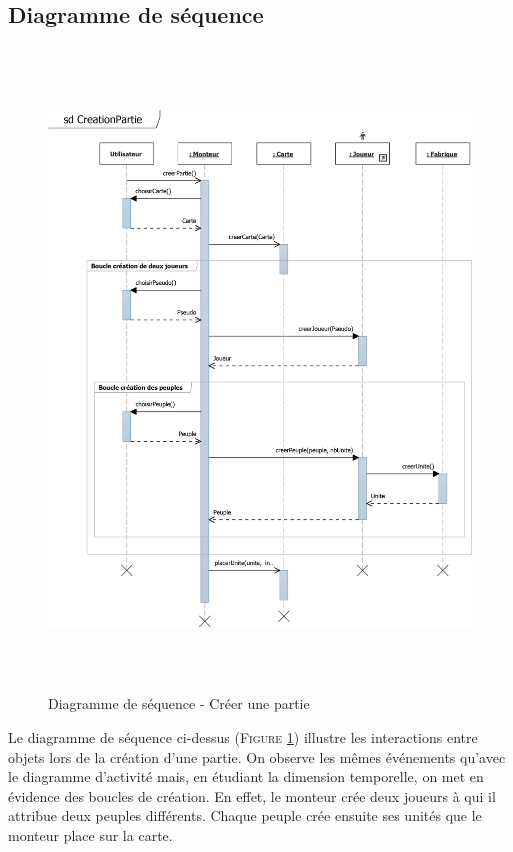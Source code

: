 \documentclass[a4paper,11pt]{article}
\begin{document}
	\subsection{Diagramme de séquence}
		\begin{figure}[ht!]
			\includegraphics[height=17cm]{Diagrammes/Creation/sqCreerPartie.png}
			\caption{Diagramme de séquence - Créer une partie}
			\label{fig:seqcreer}
			\end{figure}
		\vspace*{1cm}
		Le diagramme de séquence ci-dessus (\textsc{Figure \ref{fig:seqcreer}}) illustre les interactions entre objets lors de la création d'une partie. On observe les mêmes événements qu'avec le diagramme d'activité mais, en étudiant la dimension temporelle, on met en évidence des boucles de création. En effet, le monteur crée deux joueurs à qui il attribue deux peuples différents. Chaque peuple crée ensuite ses unités que le monteur place sur la carte.
		\newpage 
\end{document}
